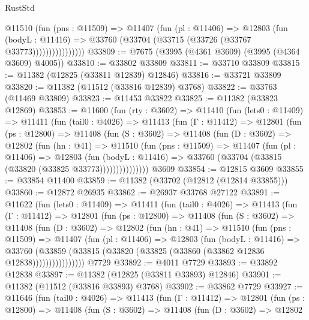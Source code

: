 \begin{lexlean}{RustStd}
\begin{coremodule}
                    @11510
                      (fun (pns : @11509) =>
                      @11407
                        (fun (pl : @11406) =>
                        @12803
                          (fun (bodyL : @11416) =>
                          @33760 (@33704 (@33715 (@33726 (@33767 @33773))))))))))))))))
@33809 := @7675 (@3995 (@4361 @3609) (@3995 (@4364 @3609) @4005))
@33810 := @33802 @33809
@33811 := @33710 @33809
@33815 := @11382 (@12825 (@33811 @12839) @12846)
@33816 := @33721 @33809
@33820 := @11382 (@11512 (@33816 @12839) @3768)
@33822 := @33763 (@11469 @33809)
@33823 := @11453 @33822
@33825 := @11382 (@33823 @12869)
@33853 := @11600
    (fun (rty : @3602) =>
    @11410
      (fun (lets0 : @11409) =>
      @11411
        (fun (tail0 : @4026) =>
        @11413
          (fun (Γ : @11412) =>
          @12801
            (fun (ps : @12800) =>
            @11408
              (fun (S : @3602) =>
              @11408
                (fun (D : @3602) =>
                @12802
                  (fun (hn : @41) =>
                  @11510
                    (fun (pns : @11509) =>
                    @11407
                      (fun (pl : @11406) =>
                      @12803
                        (fun (bodyL : @11416) =>
                        @33760 (@33704 (@33815 (@33820 (@33825 @33773)))))))))))))))
    @3609
@33854 := @12815 @3609
@33855 := @33854 @11400
@33859 := @11382 (@33702 (@12812 (@12814 @33855)))
@33860 := @12872 @26935
@33862 := @26937 @33768 @27122
@33891 := @11622
    (fun (lets0 : @11409) =>
    @11411
      (fun (tail0 : @4026) =>
      @11413
        (fun (Γ : @11412) =>
        @12801
          (fun (ps : @12800) =>
          @11408
            (fun (S : @3602) =>
            @11408
              (fun (D : @3602) =>
              @12802
                (fun (hn : @41) =>
                @11510
                  (fun (pns : @11509) =>
                  @11407
                    (fun (pl : @11406) =>
                    @12803
                      (fun (bodyL : @11416) =>
                      @33760
                        (@33859
                          (@33815 (@33820 (@33825 (@33860 (@33862 @12836 @12838))))))))))))))))
    @7729
@33892 := @4011 @7729
@33893 := @33892 @12838
@33897 := @11382 (@12825 (@33811 @33893) @12846)
@33901 := @11382 (@11512 (@33816 @33893) @3768)
@33902 := @33862 @7729
@33927 := @11646
    (fun (tail0 : @4026) =>
    @11413
      (fun (Γ : @11412) =>
      @12801
        (fun (ps : @12800) =>
        @11408
          (fun (S : @3602) =>
          @11408
            (fun (D : @3602) =>
            @12802

\end{coremodule}
\end{lexlean}
